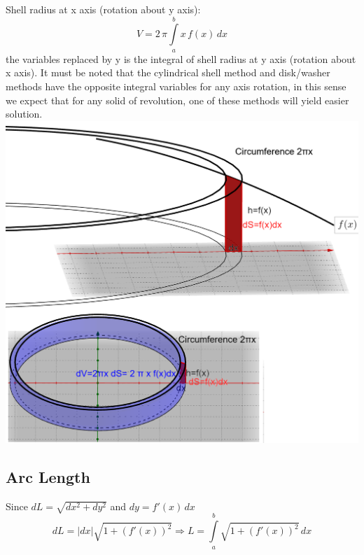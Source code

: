 \documentclass[12pt]{article}
\begin{document}
Shell radius at x axis (rotation about y axis): $$V=2\,\pi \int \limits_a^b x\,f(x)\,dx $$ the variables replaced by y is the integral of shell radius at y axis (rotation about x axis). It must be noted that the cylindrical shell method and disk/washer methods have the opposite integral variables for any axis rotation, in this sense we expect that for any solid of revolution, one of these methods will yield easier solution.\\
\includegraphics[scale=0.446]{shell.png}
\newpage
\subsection{Arc Length}
Since $dL=\sqrt{dx^2+dy^2}$ and $dy=f'(x)\,dx$ $$dL=|dx|\sqrt{1+(f'(x))^2} \Rightarrow L=\int \limits_a^b \sqrt{1+(f'(x))^2} \,dx$$
\end{document}
